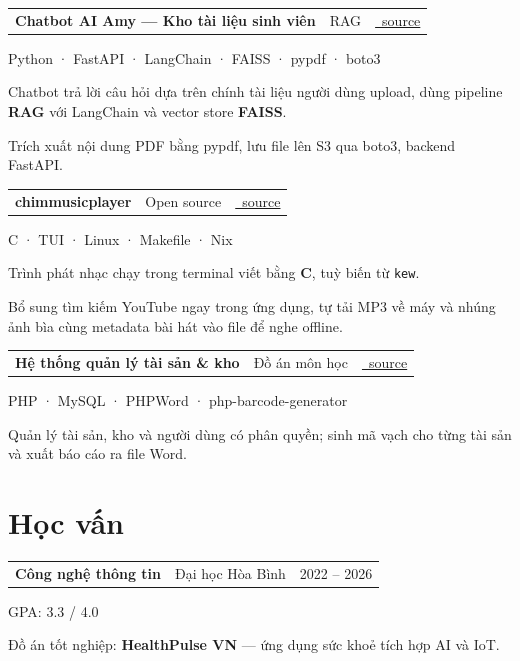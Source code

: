 \documentclass[11pt,a4paper]{article}
\makeatletter
\newcommand{\icoGit}{\faGithub~}
\newcommand{\icoGit}{}
\newcommand{\role}[3]{%
  \vspace{5pt}\par
  \begin{tabularx}{\linewidth}{@{}X r@{}}
    \textbf{#1}\ \textcolor{muted}{\textbar}\ #2 & \textcolor{muted}{\small #3}
  \end{tabularx}\par
  \vspace{2pt}%
}
\newcommand{\project}[4]{%
  \vspace{6pt}\par
  \begin{tabularx}{\linewidth}{@{}X r@{}}
    \textbf{#1}\ \textcolor{muted}{\textbar}\ \textcolor{muted}{\small #2}
    & \href{#3}{\icoGit\ttfamily\footnotesize source}
  \end{tabularx}\par
  {\footnotesize\color{accent}#4\par}%
  \vspace{2pt}%
}
\makeatother
\begin{document}
\project{Chatbot AI Amy --- Kho tài liệu sinh viên}{RAG}{https://github.com/Hdoanf/demo}%
{Python · FastAPI · LangChain · FAISS · pypdf · boto3}
\begin{pts}
  \item Chatbot trả lời câu hỏi dựa trên chính tài liệu người dùng upload, dùng pipeline
        \textbf{RAG} với LangChain và vector store \textbf{FAISS}.
  \item Trích xuất nội dung PDF bằng pypdf, lưu file lên S3 qua boto3, backend FastAPI.
\end{pts}

\project{chimmusicplayer}{Open source}{https://github.com/Hdoanf/chimmusicplayer}%
{C · TUI · Linux · Makefile · Nix}
\begin{pts}
  \item Trình phát nhạc chạy trong terminal viết bằng \textbf{C}, tuỳ biến từ \texttt{kew}.
  \item Bổ sung tìm kiếm YouTube ngay trong ứng dụng, tự tải MP3 về máy và nhúng ảnh bìa
        cùng metadata bài hát vào file để nghe offline.
\end{pts}

\project{Hệ thống quản lý tài sản \& kho}{Đồ án môn học}{https://github.com/Hdoanf/hdoanf.github}%
{PHP · MySQL · PHPWord · php-barcode-generator}
\begin{pts}
  \item Quản lý tài sản, kho và người dùng có phân quyền; sinh mã vạch cho từng tài sản
        và xuất báo cáo ra file Word.
\end{pts}

\section{Học vấn}

\role{Công nghệ thông tin}{Đại học Hòa Bình}{2022 -- 2026}
\begin{pts}
  \item GPA: 3.3 / 4.0
  \item Đồ án tốt nghiệp: \textbf{HealthPulse VN} --- ứng dụng sức khoẻ tích hợp AI và IoT.
\end{pts}
\end{document}

